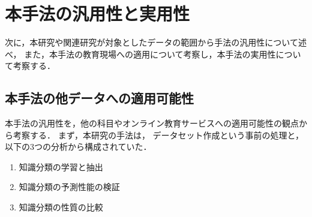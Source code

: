 \section{本手法の汎用性と実用性}
次に，本研究や関連研究が対象としたデータの範囲から手法の汎用性について述べ，
また，本手法の教育現場への適用について考察し，本手法の実用性について考察する．
%
%
%


\subsection{本手法の他データへの適用可能性}
本手法の汎用性を，他の科目やオンライン教育サービスへの適用可能性の観点から考察する．
まず，本研究の手法は，
データセット作成という事前の処理と，以下の3つの分析から構成されていた．
\begin{enumerate}
	\item 知識分類の学習と抽出
	\item 知識分類の予測性能の検証
	\item 知識分類の性質の比較
\end{enumerate}

